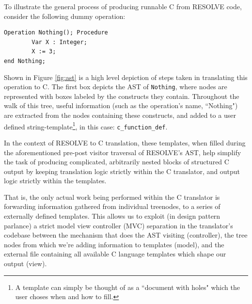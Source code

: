 
To illustrate the general process of producing runnable C from RESOLVE code, consider the following dummy operation:

\begin{verbatim}
Operation Nothing(); Procedure
        Var X : Integer;
        X := 3;
end Nothing;
\end{verbatim}

Shown in Figure \ref{fig:ast} is a high level depiction of steps taken in translating this operation to C. The first box depicts the AST of \texttt{Nothing}, where nodes are represented with boxes labeled by the constructs they contain. Throughout the walk of this tree, useful information (such as the operation's name, ``Nothing") are extracted from the nodes containing these constructs, and added to a user defined string-template\footnote{A template can simply be thought of as a ``document with holes" which the user choses when and how to fill.}, in this case: \texttt{c\_function\_def}.

In the context of RESOLVE to C translation, these templates, when filled during the aforementioned pre-post visitor traversal of RESOLVE's AST, help simplify the task of producing complicated, arbitrarily nested blocks of structured C output by keeping translation logic strictly within the C translator, and output logic strictly within the templates.

That is, the only actual work being performed within the C translator is forwarding information gathered from individual treenodes, to a series of externally defined templates. This allows us to exploit (in design pattern parlance) a strict model view controller (MVC) separation in the translator's codebase between the mechanism that does the AST visiting (controller), the tree nodes from which we're adding information to templates (model), and the external file containing all available C language templates which shape our output (view).

